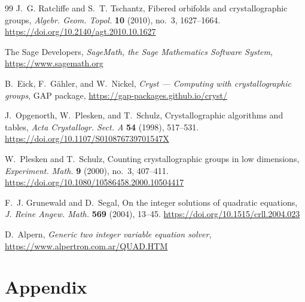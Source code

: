 \documentclass[draft]{adm-paper}
\theoremstyle{definition}
\begin{document}
\begin{thebibliography}{99}
  J.~G. Ratcliffe and S.~T. Tschantz,
  Fibered orbifolds and crystallographic groups,
  \emph{Algebr. Geom. Topol.} \textbf{10} (2010), no.~3, 1627--1664.
  \url{https://doi.org/10.2140/agt.2010.10.1627}

  The Sage Developers,
  \emph{SageMath, the Sage Mathematics Software System},
  \url{https://www.sagemath.org}

  B.~Eick, F.~G\"ahler, and W.~Nickel,
  \emph{Cryst --- Computing with crystallographic groups},
  GAP package, \url{https://gap-packages.github.io/cryst/}

  J.~Opgenorth, W.~Plesken, and T.~Schulz,
  Crystallographic algorithms and tables,
  \emph{Acta Crystallogr. Sect. A} \textbf{54} (1998), 517--531.
  \url{https://doi.org/10.1107/S010876739701547X}

  W.~Plesken and T.~Schulz,
  Counting crystallographic groups in low dimensions,
  \emph{Experiment. Math.} \textbf{9} (2000), no.~3, 407--411.
  \url{https://doi.org/10.1080/10586458.2000.10504417}

  F.~J. Grunewald and D.~Segal,
  On the integer solutions of quadratic equations,
  \emph{J. Reine Angew. Math.} \textbf{569} (2004), 13--45.
  \url{https://doi.org/10.1515/crll.2004.023}

  D.~Alpern,
  \emph{Generic two integer variable equation solver},
  \url{https://www.alpertron.com.ar/QUAD.HTM}

\end{thebibliography}


\appendix
\section*{Appendix}









% 
\end{document}
